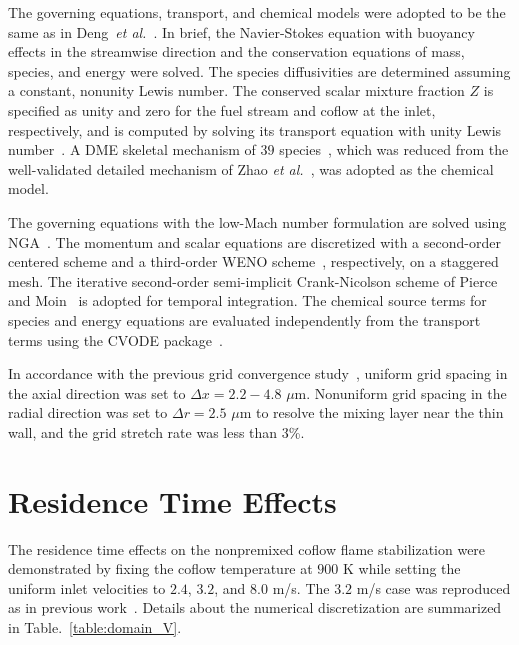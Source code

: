 \documentclass{wssci}
\begin{document}
The governing equations, transport, and chemical models were adopted to be the same as in Deng~\emph{et al.}~\cite{deng15}.  In brief, the Navier-Stokes equation with buoyancy effects in the streamwise direction and the conservation equations of mass, species, and energy were solved.  The species diffusivities are determined assuming a constant, nonunity Lewis number.  The conserved scalar mixture fraction $Z$ is specified as unity and zero for the fuel stream and coflow at the inlet, respectively, and is computed by solving its transport equation with unity Lewis number~\cite{pitsch98b}.  A DME skeletal mechanism of $39$ species~\cite{bhagatwala15}, which was reduced from the well-validated detailed mechanism of Zhao \emph{et al.}~\cite{zhao08}, was adopted as the chemical model.

The governing equations with the low-Mach number formulation are solved using NGA~\cite{desjardins08}.  The momentum and scalar equations are discretized with a second-order centered scheme and a third-order WENO scheme~\cite{liu94}, respectively, on a staggered mesh.  The iterative second-order semi-implicit Crank-Nicolson scheme of Pierce and Moin~\cite{pierce01} is adopted for temporal integration.  The chemical source terms for species and energy equations are evaluated independently from the transport terms using the CVODE package~\cite{cohen96}.

In accordance with the previous grid convergence study~\cite{deng15}, uniform grid spacing in the axial direction was set to $\Delta x = 2.2-4.8$ $\mu$m.  Nonuniform grid spacing in the radial direction was set to $\Delta r = 2.5$ $\mu$m to resolve the mixing layer near the thin wall, and the grid stretch rate was less than $3$\%.    
\section{Residence Time Effects}

The residence time effects on the nonpremixed coflow flame stabilization were demonstrated by fixing the coflow temperature at $900$ K while setting the uniform inlet velocities to $2.4$, $3.2$, and $8.0$ m/s.  The $3.2$ m/s case was reproduced as in previous work~\cite{deng15}.  Details about the numerical discretization are summarized in Table.~\ref{table:domain_V}.

\begin{table}
  \caption{Computational domain and number of grid points.}
  \label{table:domain_V}
  \centering
  \normalsize
\end{table}
\end{document}
